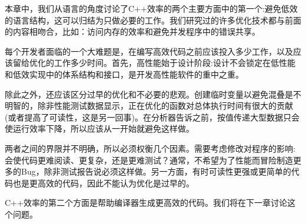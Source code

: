 本章中，我们从语言的角度讨论了C++效率的两个主要方面中的第一个:避免低效的语言结构，这可以归结为只做必要的工作。我们研究过的许多优化技术都与前面的内容相吻合，比如：访问内存的效率和避免并发程序中的错误共享。

每个开发者面临的一个大难题是，在编写高效代码之前应该投入多少工作，以及应该留给优化的工作多少时间。首先，高性能始于设计阶段:设计不会锁定在低性能和低效实现中的体系结构和接口，是开发高性能软件的重中之重。 

除此之外，还应该区分过早的优化和不必要的悲观。创建临时变量以避免混叠是不明智的，除非性能测试数据显示，正在优化的函数对总体执行时间有很大的贡献(或者提高了可读性，这是另一回事)。在分析器告诉之前，按值传递大型数据只会使运行效率下降，所以应该从一开始就避免这样做。 

两者之间的界限并不明确，所以必须权衡几个因素。需要考虑修改对程序的影响:会使代码更难阅读、更复杂，还是更难测试？通常，不希望为了性能而冒险制造更多的Bug，除非测试报告说必须这样做。另一方面，有时可读性更强或更简单的代码也是更高效的代码，因此不能认为优化是过早的。 

C++效率的第二个方面是帮助编译器生成更高效的代码。我们将在下一章讨论这个问题。